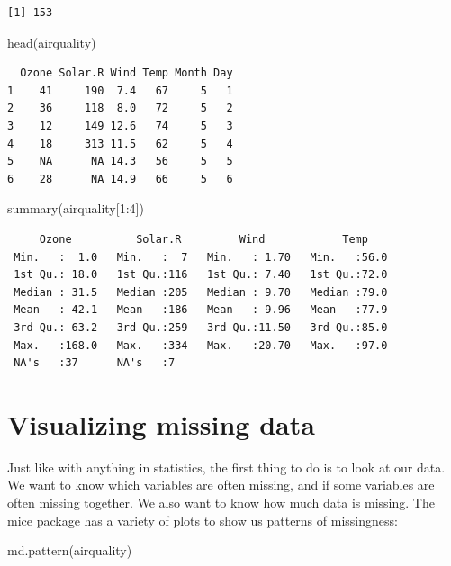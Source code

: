 \documentclass[
  letterpaper,
  DIV=11,
  numbers=noendperiod]{scrreprt}
\newenvironment{Shaded}{}{}
\newcommand{\DecValTok}[1]{\textcolor[rgb]{0.25,0.63,0.44}{#1}}
\newcommand{\FunctionTok}[1]{\textcolor[rgb]{0.02,0.16,0.49}{#1}}
\newcommand{\NormalTok}[1]{#1}
\newcommand{\SpecialCharTok}[1]{\textcolor[rgb]{0.25,0.44,0.63}{#1}}
\begin{document}
\begin{verbatim}
[1] 153
\end{verbatim}

\begin{Shaded}
\begin{Highlighting}[]
  \FunctionTok{head}\NormalTok{(airquality)}
\end{Highlighting}
\end{Shaded}

\begin{verbatim}
  Ozone Solar.R Wind Temp Month Day
1    41     190  7.4   67     5   1
2    36     118  8.0   72     5   2
3    12     149 12.6   74     5   3
4    18     313 11.5   62     5   4
5    NA      NA 14.3   56     5   5
6    28      NA 14.9   66     5   6
\end{verbatim}

\begin{Shaded}
\begin{Highlighting}[]
  \FunctionTok{summary}\NormalTok{(airquality[}\DecValTok{1}\SpecialCharTok{:}\DecValTok{4}\NormalTok{])}
\end{Highlighting}
\end{Shaded}

\begin{verbatim}
     Ozone          Solar.R         Wind            Temp     
 Min.   :  1.0   Min.   :  7   Min.   : 1.70   Min.   :56.0  
 1st Qu.: 18.0   1st Qu.:116   1st Qu.: 7.40   1st Qu.:72.0  
 Median : 31.5   Median :205   Median : 9.70   Median :79.0  
 Mean   : 42.1   Mean   :186   Mean   : 9.96   Mean   :77.9  
 3rd Qu.: 63.2   3rd Qu.:259   3rd Qu.:11.50   3rd Qu.:85.0  
 Max.   :168.0   Max.   :334   Max.   :20.70   Max.   :97.0  
 NA's   :37      NA's   :7                                   
\end{verbatim}

\newpage

\section{Visualizing missing data}\label{visualizing-missing-data}

Just like with anything in statistics, the first thing to do is to look
at our data. We want to know which variables are often missing, and if
some variables are often missing together. We also want to know how much
data is missing. The mice package has a variety of plots to show us
patterns of missingness:

\begin{Shaded}
\begin{Highlighting}[]
  \FunctionTok{md.pattern}\NormalTok{(airquality)}
\end{Highlighting}
\end{Shaded}
\end{document}
